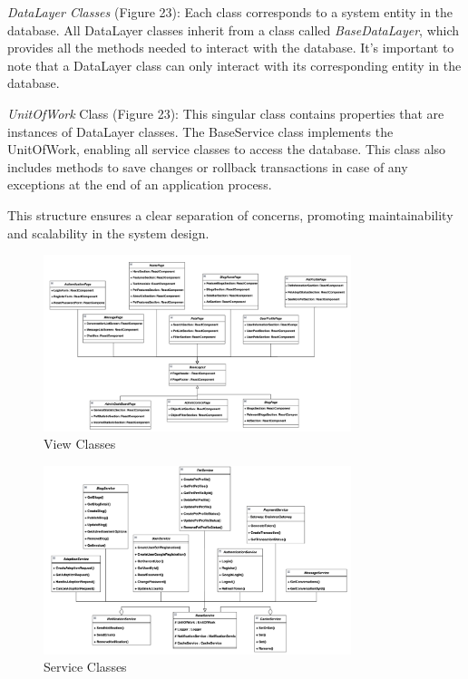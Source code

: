 \emph{DataLayer Classes} (Figure 23): Each class corresponds to a system
entity in the database. All DataLayer classes inherit from a class
called \emph{BaseDataLayer}, which provides all the methods needed to
interact with the database. It's important to note that a DataLayer
class can only interact with its corresponding entity in the database.

\emph{UnitOfWork} Class (Figure 23): This singular class contains
properties that are instances of DataLayer classes. The BaseService
class implements the UnitOfWork, enabling all service classes to access
the database. This class also includes methods to save changes or
rollback transactions in case of any exceptions at the end of an
application process.

This structure ensures a clear separation of concerns, promoting
maintainability and scalability in the system design.

\begin{figure}[H]
  \centering
  \includegraphics[angle=-90,width=0.8\textwidth]{Figures/view_class.png}
  \caption{View Classes}
  \label{fig:view-classes}
\end{figure}
\clearpage

\begin{figure}[H]
  \centering
  \includegraphics[angle=-90,width=0.8\textwidth]{Figures/service_class.png}
  \caption{Service Classes}
  \label{fig:service-classes}
\end{figure}

